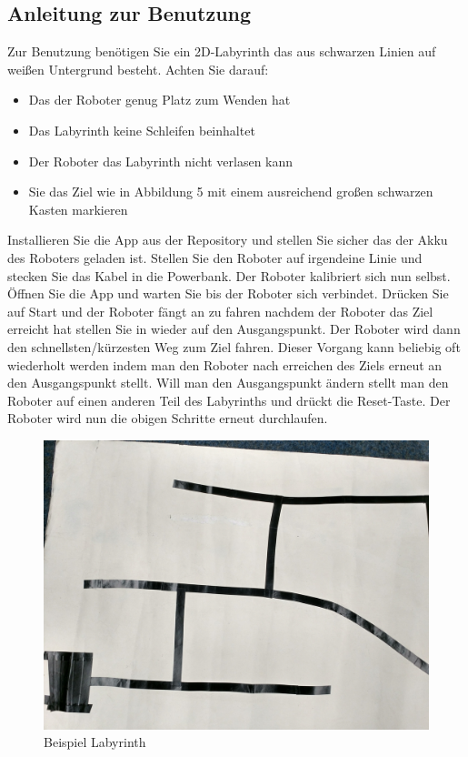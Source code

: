 \documentclass[12pt]{article}
\begin{document}
\subsection{Anleitung zur Benutzung}
Zur Benutzung benötigen Sie ein 2D-Labyrinth das aus schwarzen Linien auf weißen Untergrund besteht. Achten Sie darauf:
\begin{itemize}
\item Das der Roboter genug Platz zum Wenden hat
\item Das Labyrinth keine Schleifen beinhaltet
\item Der Roboter das Labyrinth nicht verlasen kann
\item Sie das Ziel wie in Abbildung 5 mit einem ausreichend großen schwarzen Kasten markieren
\end{itemize}
Installieren Sie die App aus der Repository\cite{Repo} und stellen Sie sicher das der Akku des Roboters geladen ist. Stellen Sie den Roboter auf irgendeine Linie und stecken Sie das Kabel in die Powerbank. Der Roboter kalibriert sich nun selbst. Öffnen Sie die App und warten Sie bis der Roboter sich verbindet. Drücken Sie auf Start und der Roboter fängt an zu fahren nachdem der Roboter das Ziel erreicht hat stellen Sie in wieder auf den Ausgangspunkt. Der Roboter wird dann den schnellsten/kürzesten Weg zum Ziel fahren. Dieser Vorgang kann beliebig oft wiederholt werden indem man den Roboter nach erreichen des Ziels erneut an den Ausgangspunkt stellt. Will man den Ausgangspunkt ändern stellt man den Roboter auf einen anderen Teil des Labyrinths und drückt die Reset-Taste. Der Roboter wird nun die obigen Schritte erneut durchlaufen.

\begin{figure}[thb]
\includegraphics[width=1\textwidth]{images/line_path.jpg}
\caption{Beispiel Labyrinth}
\end{figure}
\end{document}
